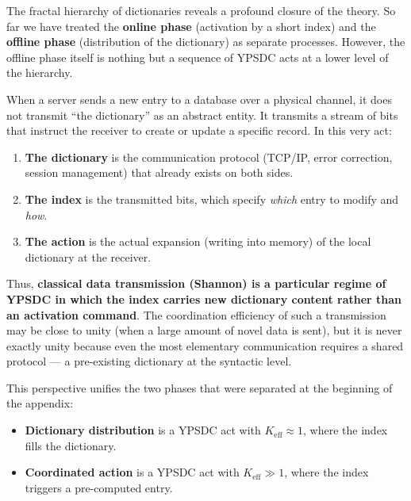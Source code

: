 \documentclass[12pt,a4paper]{article}
\theoremstyle{remark}
\begin{document}
	The fractal hierarchy of dictionaries reveals a profound closure of
	the theory.  So far we have treated the \textbf{online phase}
	(activation by a short index) and the \textbf{offline phase}
	(distribution of the dictionary) as separate processes.  However, the
	offline phase itself is nothing but a sequence of YPSDC acts at a
	lower level of the hierarchy.
	
	When a server sends a new entry to a database over a physical channel,
	it does not transmit ``the dictionary'' as an abstract entity.  It
	transmits a stream of bits that instruct the receiver to create or
	update a specific record.  In this very act:
	
	\begin{enumerate}[leftmargin=*]
		\item \textbf{The dictionary} is the communication protocol
		(TCP/IP, error correction, session management) that already
		exists on both sides.
		\item \textbf{The index} is the transmitted bits, which specify
		\emph{which} entry to modify and \emph{how}.
		\item \textbf{The action} is the actual expansion (writing into
		memory) of the local dictionary at the receiver.
	\end{enumerate}
	
	Thus, \textbf{classical data transmission (Shannon) is a particular
		regime of YPSDC in which the index carries new dictionary content
		rather than an activation command}.  The coordination efficiency of
	such a transmission may be close to unity (when a large amount of
	novel data is sent), but it is never exactly unity because even the
	most elementary communication requires a shared protocol --- a
	pre-existing dictionary at the syntactic level.
	
	This perspective unifies the two phases that were separated at the
	beginning of the appendix:
	
	\begin{itemize}[leftmargin=*]
		\item \textbf{Dictionary distribution} is a YPSDC act with
		$K_{\mathrm{eff}} \approx 1$, where the index fills the
		dictionary.
		\item \textbf{Coordinated action} is a YPSDC act with
		$K_{\mathrm{eff}} \gg 1$, where the index triggers a
		pre-computed entry.
	\end{itemize}
	
\end{document}

